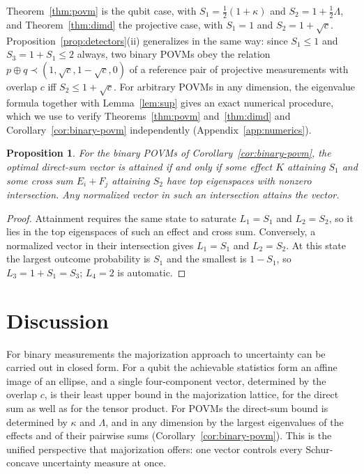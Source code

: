 \documentclass[aps,pra,twocolumn,superscriptaddress,nofootinbib,floatfix]{revtex4-2}
\newtheorem{proposition}{Proposition}
\theoremstyle{definition}
\newcommand{\maj}{\prec}
\newcommand{\sqc}{\sqrt{c}}
\begin{document}
Theorem~\ref{thm:povm} is the qubit case, with $S_1=\frac12(1+\kappa)$ and
$S_2=1+\frac12\Lambda$, and Theorem~\ref{thm:dimd} the projective case, with
$S_1=1$ and $S_2=1+\sqc$. Proposition~\ref{prop:detectors}(ii) generalizes in
the same way: since $S_1\le1$ and $S_3=1+S_1\le2$ always, two binary POVMs obey
the relation $p\oplus q\maj(1,\sqc,1-\sqc,0)$ of a reference pair of projective
measurements with overlap $c$ iff $S_2\le1+\sqc$. For arbitrary POVMs in any
dimension, the eigenvalue
formula together with Lemma~\ref{lem:sup} gives an exact numerical procedure,
which we use to verify Theorems~\ref{thm:povm} and~\ref{thm:dimd} and
Corollary~\ref{cor:binary-povm} independently (Appendix~\ref{app:numerics}).

\begin{proposition}
\label{prop:spectral-attainment}
For the binary POVMs of Corollary~\ref{cor:binary-povm}, the optimal direct-sum
vector is attained if and only if some effect $K$ attaining $S_1$ and some cross
sum $E_i+F_j$ attaining $S_2$ have top eigenspaces with nonzero intersection. Any
normalized vector in such an intersection attains the vector.
\end{proposition}

\begin{proof}
Attainment requires the same state to saturate $L_1=S_1$ and $L_2=S_2$, so it lies
in the top eigenspaces of such an effect and cross sum. Conversely, a normalized
vector in their intersection gives $L_1=S_1$ and $L_2=S_2$. At this state the
largest outcome probability is $S_1$ and the smallest is $1-S_1$, so
$L_3=1+S_1=S_3$; $L_4=2$ is automatic.
\end{proof}

\section{Discussion}
\label{sec:discussion}

For binary measurements the majorization approach to uncertainty can be
carried out in closed form. For a qubit the achievable statistics form an
affine image of an ellipse, and a single four-component vector, determined by
the overlap $c$, is their least upper bound in the majorization lattice, for the
direct sum as well as for the tensor product. For POVMs the direct-sum bound is
determined by $\kappa$ and $\Lambda$, and in any dimension by the largest
eigenvalues of the effects and of their pairwise sums
(Corollary~\ref{cor:binary-povm}). This is the unified perspective that
majorization offers: one vector controls every Schur-concave uncertainty
measure at once.
\end{document}
